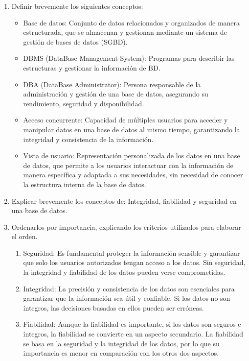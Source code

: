 \begin{enumerate}
    \item Definir brevemente los siguientes conceptos:
    \begin{itemize}
        \item Base de datos: Conjunto de datos relacionados y organizados de manera estructurada, que se almacenan y gestionan mediante un sistema de gestión de bases de datos (SGBD).
        \item DBMS (DataBase Management System): Programas para describir las estructuras y gestionar la información de BD.
        \item DBA (DataBase Administrator): Persona responsable de la administración y gestión de una base de datos, asegurando su rendimiento, seguridad y disponibilidad.
        \item Acceso concurrente: Capacidad de múltiples usuarios para acceder y manipular datos en una base de datos al mismo tiempo, garantizando la integridad y consistencia de la información.
        \item Vista de usuario: Representación personalizada de los datos en una base de datos, que permite a los usuarios interactuar con la información de manera específica y adaptada a sus necesidades, sin necesidad de conocer la estructura interna de la base de datos.
    \end{itemize}
    \item Explicar brevemente los conceptos de: Integridad, fiabilidad y seguridad en una base de datos.
        \item Ordenarlos por importancia, explicando los criterios utilizados para elaborar el orden.
        
        \begin{enumerate}
            \item Seguridad: Es fundamental proteger la información sensible y garantizar que solo los usuarios autorizados tengan acceso a los datos. Sin seguridad, la integridad y fiabilidad de los datos pueden verse comprometidas.
            \item Integridad: La precisión y consistencia de los datos son esenciales para garantizar que la información sea útil y confiable. Si los datos no son íntegros, las decisiones basadas en ellos pueden ser erróneas.
            \item Fiabilidad: Aunque la fiabilidad es importante, si los datos son seguros e íntegros, la fiabilidad se convierte en un aspecto secundario. La fiabilidad se basa en la seguridad y la integridad de los datos, por lo que su importancia es menor en comparación con los otros dos aspectos.
        \end{enumerate}


\end{enumerate}
